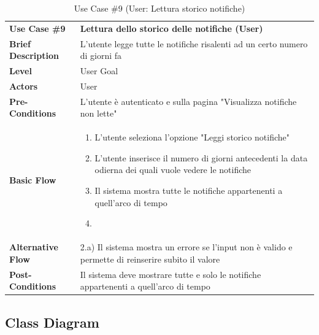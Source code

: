 \documentclass[a4paper, 11pt]{article}
\begin{document}
	\begin{table}[h]
		\centering
		\setlength{\arrayrulewidth}{0.8pt} %

		\begin{tabular}{|l p{12cm}|}
			\hline

			\rowcolor{gray!25}
			\textbf{Use Case \#9} & \textbf{Lettura dello storico delle notifiche (User)} \\
			\textbf{Brief Description} & L'utente legge tutte le notifiche risalenti ad un certo numero di giorni fa \\
			\textbf{Level} & User Goal \\
			\textbf{Actors} & User \\
			\textbf{Pre-Conditions} & L'utente è autenticato e sulla pagina "Visualizza notifiche non lette" \\
			\textbf{Basic Flow} & \begin{enumerate}[label=\arabic*), leftmargin=*, before=\vspace{-0.7cm}, after=\vspace{-0.4cm}]
									  \item L'utente seleziona l'opzione "Leggi storico notifiche"
									  \item L'utente inserisce il numero di giorni antecedenti la data odierna dei quali vuole vedere le notifiche
									  \item Il sistema mostra tutte le notifiche appartenenti a quell'arco di tempo
									  \item[]
			\end{enumerate} \\
			\textbf{Alternative Flow} & 2.a) Il sistema mostra un errore se l'input non è valido e permette di reinserire subito il valore\\
			\textbf{Post-Conditions} & Il sistema deve mostrare tutte e solo le notifiche appartenenti a quell'arco di tempo \\

			\hline
		\end{tabular}

		\vspace{0.2cm}
		\caption{Use Case \#9 (User: Lettura storico notifiche)}
	\end{table}
	\vspace{1cm}
	\clearpage
	\subsection{Class Diagram}
\end{document}
